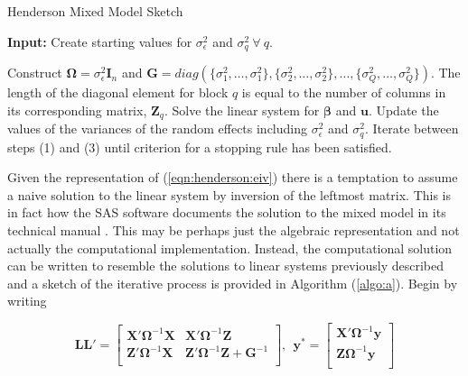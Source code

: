 \documentclass[12pt]{article}
\begin{document}
\begin{algorithm}
\caption{Henderson Mixed Model Sketch}
\label{algo:a}
	\hspace*{\algorithmicindent} \textbf{Input:} Create starting values for $\sigma^2_{\epsilon}$ and $\sigma^2_{q} \ \forall \ q$.
\begin{algorithmic}[1]
	\State Construct $\bm{\Omega} = \sigma^2_{\epsilon}\bm{I}_n$ and $\bm{G}=diag(\{\sigma^2_{1}, \ldots, \sigma^2_{1}\}, \{\sigma^2_{2}, \ldots, \sigma^2_{2}\}, \ldots, \{\sigma^2_{Q}, \ldots, \sigma^2_{Q}\} )$. The length of the diagonal element for block $q$ is equal to the number of columns in its corresponding matrix, $\bm{Z}_q$.
	\State Solve the linear system for $\bm{\beta}$ and $\bm{u}$.
	\State Update the values of the variances of the random effects including $\sigma^2_{\epsilon}$ and $\sigma^2_{q}$.
	\State Iterate between steps (1) and (3) until criterion for a stopping rule has been satisfied. 
\end{algorithmic}
\end{algorithm}

Given the representation of (\ref{eqn:henderson:eiv}) there is a temptation to assume a naive solution to the linear system by inversion of the leftmost matrix. This is in fact how the SAS software documents the solution to the mixed model in its technical manual \cite{sas}. This may be perhaps just the algebraic representation and not actually the computational implementation. Instead, the computational solution can be written to resemble the solutions to linear systems previously described and a sketch of the iterative process is provided in Algorithm (\ref{algo:a}). Begin by writing 

\begin{equation}
\label{eqn:chol}
\bm{L}\bm{L}' = 
\left [ 
\begin{array}{cc}
\bm{X'}\bm{\Omega}^{-1}\bm{X}& \bm{X'}\bm{\Omega}^{-1}\bm{Z}\\
\bm{Z}'\bm{\Omega}^{-1}\bm{X} & \bm{Z}'\bm{\Omega}^{-1}\bm{Z} + \bm{G}^{-1}\\
\end{array}
\right], \ \ 
\bm{y}^* = 
\left [ 
\begin{array}{c}
\bm{X'}\bm{\Omega}^{-1}\bm{y} \\
\bm{Z}\bm{\Omega}^{-1}\bm{y}\\
\end{array}
\right]
\end{equation}
\end{document}
